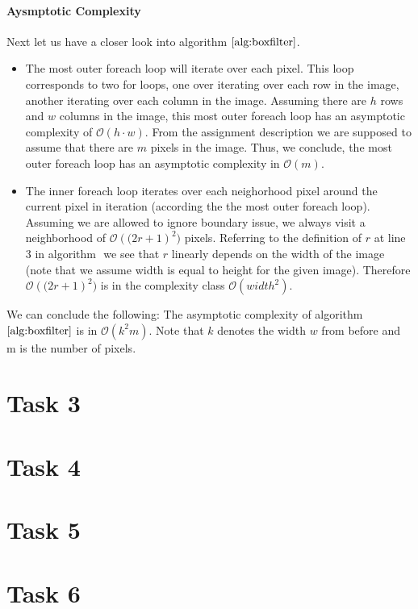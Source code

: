 \documentclass{paper}
\begin{document}
\paragraph{Aysmptotic Complexity} Next let us have a closer look into algorithm $\ref{alg:boxfilter}$.
\begin{itemize}
    \item The most outer foreach loop will iterate over each pixel. This loop corresponds to two for loops, one over iterating over each row in the image, another iterating over each column in the image. Assuming there are $h$ rows and $w$ columns in the image, this most outer foreach loop has an asymptotic complexity of $\mathcal{O}(h \cdot w)$. From the assignment description we are supposed to assume that there are $m$ pixels in the image. Thus, we conclude, the most outer foreach loop has an asymptotic complexity in $\mathcal{O}(m)$.
    \item The inner foreach loop iterates over each neighorhood pixel around the current pixel in iteration (according the the most outer foreach loop). Assuming we are allowed to ignore boundary issue, we always visit a neighborhood of $\mathcal{O}\left((2r+1\right)^2)$ pixels. Referring to the definition of $r$ at line 3 in algorithm $\label{alg:boxfilter}$ we see that $r$ linearly depends on the width of the image (note that we assume width is equal to height for the given image). Therefore $\mathcal{O}\left((2r+1\right)^2)$ is in the complexity class $\mathcal{O}\left(width^2\right)$. 
\end{itemize}

We can conclude the following: The asymptotic complexity of algorithm $\ref{alg:boxfilter}$ is in $\mathcal{O}\left(k^2 m \right)$. Note that $k$ denotes the width $w$ from before and m is the number of pixels.



\section*{Task 3}
\section*{Task 4}
\section*{Task 5}




\section*{Task 6}
\end{document}
